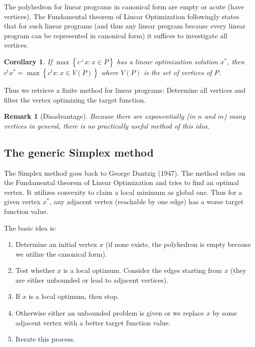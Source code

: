 \documentclass[a4paper]{article}
\newcounter{lecref}[subsection]
\numberwithin{lecref}{subsection}
\newtheorem*{Remark}{Remark}
\newtheorem{corollary}[lecref]{Corollary}
\newcommand{\Set}[1]{\left\{#1\right\}}
\begin{document}
The polyhedron for linear programs in canonical form are empty or acute (have vertices).
The Fundamental theorem of Linear Optimization followingly states that for such linear programs (and thus any linear program becausc every linear program can be represented in canonical form) it suffices to investigate all vertices.

\begin{corollary}
	\label{corollary:1.6}
	If $\max\Set{c^\bot x: x \in P}$ has a linear optimization solution $x^*$, then $c^t x^* = \max\Set{c^t x: x \in V(P)}$ where $V(P)$ is the set of vertices of $P$.
\end{corollary}

Thus we retrieve a finite method for linear programs:
Determine all vertices and filter the vertex optimizing the target function.

\begin{Remark}[Disadvantage]
	Because there are exponentially (in $n$ and $m$) many vertices in general,
	there is no practically useful method of this idea.
\end{Remark}

\subsection{The generic Simplex method}
\label{section:1.2}

The Simplex method goes back to George Dantzig (1947).
The method relies on the Fundamental theorem of Linear Optimization and tries to find an optimal vertex.
It utilizes convexity to claim a local minimum as global one. Thus for a given vertex $x^*$, any adjacent vertex (reachable by one edge) has a worse target function value.

The basic idea is:
\begin{enumerate}
	\item Determine an initial vertex $x$ (if none exists, the polyhedron is empty because we utilize the canonical form).
	\item Test whether $x$ is a local optimum. Consider the edges starting from $x$ (they are either unbounded or lead to adjacent vertices).
	\item If $x$ is a local optimum, then stop.
	\item Otherwise either an unbounded problem is given or we replace $x$ by some adjacent vertex with a better target function value.
	\item Iterate this process.
\end{enumerate}
\end{document}
